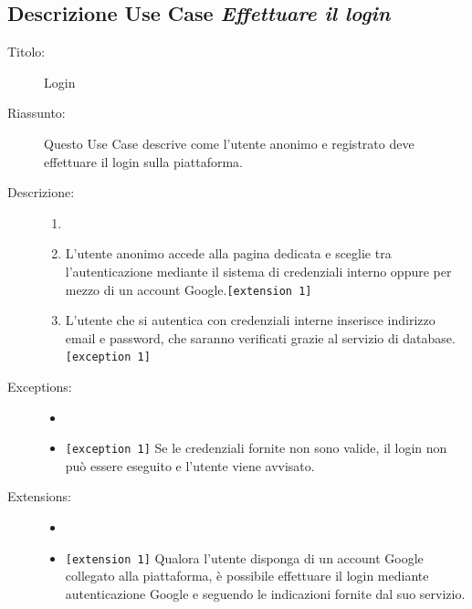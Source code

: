 \documentclass[11pt, a4paper]{article}
\theoremstyle{definition} %
\begin{document}
\subsection*{Descrizione Use Case \textit{Effettuare il login}}
\begin{description}
    \item[Titolo:] Login
    
    \item[Riassunto:] Questo Use Case descrive come l'utente anonimo e registrato deve
    effettuare il login sulla piattaforma.

    \item[Descrizione:]
    \begin{enumerate}
        \item[]
        \item L'utente anonimo accede alla pagina dedicata e sceglie tra l'autenticazione mediante il sistema di credenziali interno oppure per mezzo di un account Google.\texttt{[extension 1]}
        \item L'utente che si autentica con credenziali interne inserisce indirizzo email e password, che saranno verificati grazie al servizio di database.\texttt{[exception 1]}
    \end{enumerate}
    
    \item[Exceptions:]
    \begin{itemize}
        \item[]
        \item \verb|[exception 1]| Se le credenziali fornite non sono valide, il login non può essere eseguito e l'utente viene avvisato.
    \end{itemize}

    \item[Extensions:]
    \begin{itemize}
        \item[]
        \item \texttt{[extension 1]} Qualora l'utente disponga di un account Google collegato alla piattaforma, è possibile effettuare il login
        mediante autenticazione Google e seguendo le indicazioni fornite dal suo servizio.
    \end{itemize}
\end{description}
\end{document}
